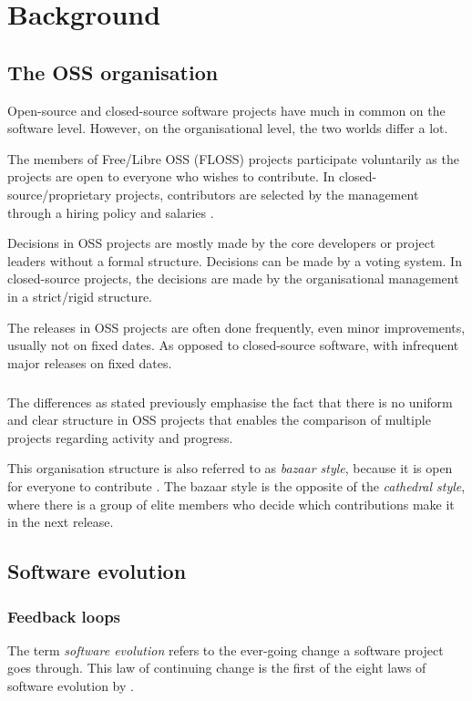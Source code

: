\chapter{Background}
\label{background}

\section{The OSS organisation}
Open-source and closed-source software projects have much in common on the
software level. However, on the organisational level, the two worlds differ a
lot.

The members of Free/Libre OSS (FLOSS) projects participate voluntarily as the
projects are open to everyone who wishes to contribute. In
closed-source/proprietary projects, contributors are selected by the management
through a hiring policy and salaries \cite{androutsellis}.

Decisions in OSS projects are mostly made by the core developers or project
leaders without a formal structure. Decisions can be made by a voting system. In
closed-source projects, the decisions are made by the organisational management
in a strict/rigid structure.

The releases in OSS projects are often done frequently, even minor improvements,
usually not on fixed dates. As opposed to closed-source software, with
infrequent major releases on fixed dates.

\paragraph{}
The differences as stated previously emphasise the fact that there is no
uniform and clear structure in OSS projects that enables the comparison of
multiple projects regarding activity and progress.

This organisation structure is also referred to as \textit{bazaar style},
because it is open for everyone to contribute \cite{androutsellis,
karus20132, nakakoji}. The bazaar style is the opposite of the
\textit{cathedral style}, where there is a group of elite members who decide
which contributions make it in the next release.


\section{Software evolution}
\label{section:lehman}
\subsection{Feedback loops}
The term \textit{software evolution} refers to the ever-going change a
software project goes through. This law of continuing change is the first of
the eight laws of software evolution by \citet{lehman}.

